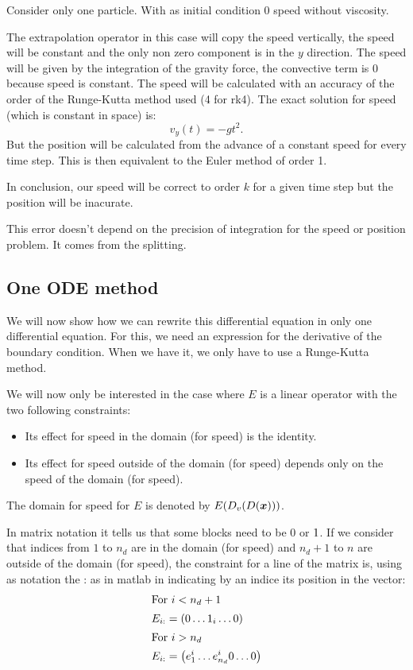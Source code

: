 \begin{example}
Consider only one particle. With as initial condition $0$ speed without viscosity.

The extrapolation operator in this case will copy the speed vertically,
the speed will be constant and the only non zero component is in the $y$ direction.
The speed will be given by the integration of the gravity force, the convective term is $0$ because speed is constant.
The speed will be calculated with an accuracy of the order of the Runge-Kutta method used (4 for rk4).
The exact solution for speed (which is constant in space) is:
\begin{equation}
 v_y(t)=-gt^2.
\end{equation}
But the position will be calculated from the advance of a constant speed for every time step. This is then equivalent to the Euler
method of order 1.

In conclusion, our speed will be correct to order $k$ for a given time step but the position will be inacurate.

This error doesn't depend on the precision of integration for the speed or position problem.
It comes from the splitting.
\end{example}

\subsection{One ODE method}
\label{differentialequation}
We will now show how we can rewrite this differential equation in only one differential equation.
For this, we need an expression for the derivative of the boundary condition.
When we have it, we only have to use a Runge-Kutta method.


We will now only be interested in the case where $E$ is a linear operator with the two following constraints:
\begin{itemize}
	\item Its effect for speed in the domain (for speed) is the identity.
	\item Its effect for speed outside of the domain (for speed) depends only on the speed of the domain (for speed).
\end{itemize}
The domain for speed for $E$ is denoted by $E(D_v(D({\boldsymbol {x}})))$.

In matrix notation it tells us that some blocks need to be $0$ or $1$.
If we consider that indices from $1$ to $n_d$ are in the domain (for speed) and $n_d+1$ to $n$ are outside of the domain (for speed), the constraint for a line of the matrix is,
using as notation the : as in matlab in indicating by an indice its position in the vector:
\begin{align}
	\intertext{For $i<n_d+1$}
	E_{i :}&=\left( 0 \ldots 1_{i} \ldots 0\right)\\
	\intertext{For $i>n_d$}
	E_{i :}&=\left( e^i_{1}\ldots e^i_{n_d} 0\ldots 0\right)\\
\end{align}

